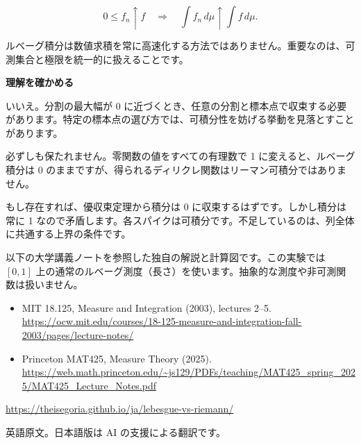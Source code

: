 \documentclass[11pt,a4paper]{article}
\newcommand{\topic}[1]{\vspace{6pt}{\large\bfseries #1}\par}
\newcommand{\pagetitle}[1]{{\LARGE\bfseries #1}\par\vspace{9pt}}
\begin{document}
\[0\le f_n\uparrow f\quad\Longrightarrow\quad\int f_n\,d\mu\uparrow\int f\,d\mu.\]

ルベーグ積分は数値求積を常に高速化する方法ではありません。重要なのは、可測集合と極限を統一的に扱えることです。

\newpage

\pagetitle{理解を確かめる}

\topic{1. 中点和の収束だけでリーマン可積分といえますか？}

いいえ。分割の最大幅が 0 に近づくとき、任意の分割と標本点で収束する必要があります。特定の標本点の選び方では、可積分性を妨げる挙動を見落とすことがあります。

\topic{2. 零集合上の値を変えてもリーマン可積分性は保たれますか？}

必ずしも保たれません。零関数の値をすべての有理数で 1 に変えると、ルベーグ積分は 0 のままですが、得られるディリクレ関数はリーマン可積分ではありません。

\topic{3. スパイクを共通に抑える可積分関数がないのはなぜ？}

もし存在すれば、優収束定理から積分は 0 に収束するはずです。しかし積分は常に 1 なので矛盾します。各スパイクは可積分です。不足しているのは、列全体に共通する上界の条件です。

\topic{参考文献と扱う範囲}

以下の大学講義ノートを参照した独自の解説と計算図です。この実験では \([0,1]\) 上の通常のルベーグ測度（長さ）を使います。抽象的な測度や非可測関数は扱いません。

\begin{itemize}\item MIT 18.125, Measure and Integration (2003), lectures 2--5. \url{https://ocw.mit.edu/courses/18-125-measure-and-integration-fall-2003/pages/lecture-notes/}\item Princeton MAT425, Measure Theory (2025). \url{https://web.math.princeton.edu/~js129/PDFs/teaching/MAT425_spring_2025/MAT425_Lecture_Notes.pdf}\end{itemize}

\url{https://theisegoria.github.io/ja/lebesgue-vs-riemann/}

英語原文。日本語版は AI の支援による翻訳です。
\end{document}
